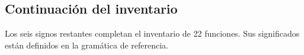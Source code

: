 \subsection*{Continuación del inventario}
Los seis signos restantes completan el inventario de 22 funciones.
Sus significados están definidos en la gramática de referencia.\par\vspace{2mm}
\noindent{}\hfill{}\hfill{}\hfill{}\par\vspace{3mm}
\noindent{}\hspace{3mm}\par

